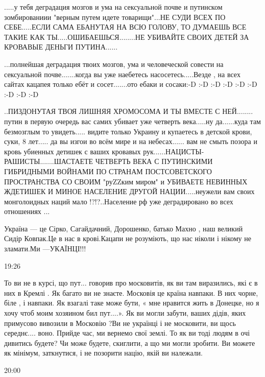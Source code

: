 {.....у тебя деградация мозгов и ума на сексуальной почве и путинском
зомбированиии "верным путем идете товарищи"...НЕ СУДИ ВСЕХ ПО СЕБЕ.....ЕСЛИ
САМА ЕБАНУТАЯ НА ВСЮ ГОЛОВУ, ТО ДУМАЕШЬ ВСЕ ТАКИЕ КАК
ТЫ.....ОШИБАЕШЬСЯ........НЕ УБИВАЙТЕ СВОИХ ДЕТЕЙ ЗА КРОВАВЫЕ ДЕНЬГИ
ПУТИНА......


...полнейшая деградация твоих мозгов, ума и человеческой совести на сексуальной
почве.......когда вы уже наебетесь насосетесь.....Везде , на всех сайтах
кацапея только ебёт и сосет.......ото ебаки и сосаки:-D :-D :-D :-D :-D :-D :-D
:-D :-D

..ПИЗДОНУТАЯ ТВОЯ ЛИШНЯЯ ХРОМОСОМА И ТЫ ВМЕСТЕ С НЕЙ........ путин в первую
очередь вас самих убивает уже четверть века.....ну да......куда там безмозглым
то увидеть..... видите только Украину и купаетесь в детской крови, суки, 8
лет..... да вы изгои во всём мире и на небесах...... вам не смыть позора и
кровь убиенных детишек с ваших кровавых рук......НАЦИСТЫ-РАШИСТЫ.......ШАСТАЕТЕ
ЧЕТВЕРТЬ ВЕКА С ПУТИНСКИМИ ГИБРИДНЫМИ ВОЙНАМИ ПО СТРАНАМ ПОСТСОВЕТСКОГО
ПРОСТРАНСТВА СО СВОИМ "руZZким миром" и УБИВАЕТЕ НЕВИННЫХ ЖДЕТИШЕК И МИНОЕ
НАСЕЛЕНИЕ ДРУГОЙ НАЦИИ.....неужели вам своих монголоидных наций мало
!?!?..Население рф уже деградировано во всех отношениях ...


Україна — це Сірко, Сагайдачний, Дорошенко, батько Махно , наш великий Сидір
Ковпак.Це в нас в крові.Кацапи не розуміють, що нас ніколи і нікому не
зламати.Ми —УКАЇНЦІ!!!


19:26

То ви не в курсі, що пут... говорив про московитів, як ви там виразились, які є
в них в Кремлі . Як багато ви не знаєте. Московія це країна навпаки. В них
чорне, біле , і навпаки. Як взагалі таке може бути, « мне нравится жить в
Донецке, но я хочу чтоб моим хозяином бил пут....». Як ви могли забути, ваших
дідів, яких примусово вивозили в Московію ?Ви не українці і не московити, ви
щось середнє.... воно. Прийде час, ми вернемо свої землі. То як ви тоді людям в
очі дивитись будете? Чи може будете, скиглити, а що ми могли зробити. Ви можете
як мінімум, заткнутися, і не позорити націю, якій ви належали.

20:00

}

